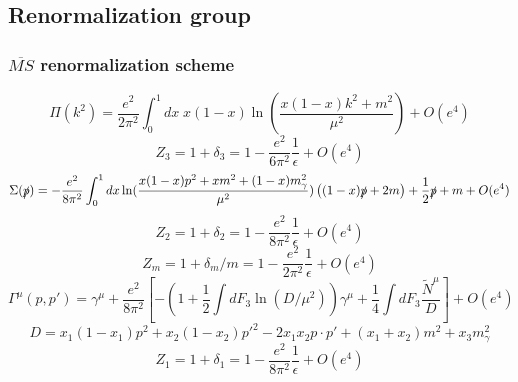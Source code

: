 \documentclass[cyan]{elegantnote}
\begin{document}
\subsection{Renormalization group}
\subsubsection{$\overline{MS}$ renormalization scheme}
\[\Pi(k^2) = \frac{e^2}{2\pi^2} \int_0^1 dx \; x(1-x) \ln(\frac{x(1-x)k^2+m^2}{\mu^2}) + O(e^4)\]
\[Z_3 = 1 + \delta_3 = 1-\frac{e^2}{6\pi^2} \frac{1}{\epsilon} + O(e^4)\]
\[\Sigma(\slashed{p}) = -\frac{e^2}{8\pi^2} \int_0^1 dx  \ln(\frac{x(1-x)p^2 + xm^2 + (1-x)m_{\gamma}^2}{\mu^2}) \left((1-x)\slashed{p}+2m\right) + \frac{1}{2}\slashed{p} + m + O(e^4) \]
\[Z_2 = 1 + \delta_2 =  1 - \frac{e^2}{8\pi^2}  \frac{1}{\epsilon} + O(e^4)\]
\[Z_m = 1 + \delta_m/m = 1 - \frac{e^2}{2\pi^2} \frac{1}{\epsilon} + O(e^4) \]
\[\Gamma^{\mu}(p,p') = \gamma^{\mu} + \frac{e^2}{8\pi^2} \left[-\left(  1 + \frac{1}{2} \int dF_3 \ln (D/\mu^2)\right)\gamma^{\mu} + \frac{1}{4} \int dF_3 \frac{\tilde{N}^{\mu}}{D}\right] + O(e^4)\]
\[D = x_1(1-x_1)p^2 + x_2(1-x_2)p'^2 - 2x_1x_2p \cdot p' + (x_1+x_2)m^2 + x_3 m_{\gamma}^2\]
\[Z_1 =1 + \delta_1 = 1 -  \frac{e^2}{8\pi^2}\frac{1}{\epsilon} + O(e^4)\]
\end{document}
